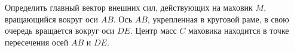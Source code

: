 Определить главный вектор внешних сил, действующих на маховик $M$, вращающийся вокруг оси $AB$. Ось $AB$, укрепленная в круговой раме, в свою очередь вращается вокруг оси $DE$. Центр масс $C$ маховика находится в точке пересечения осей $AB$ и $DE$.
